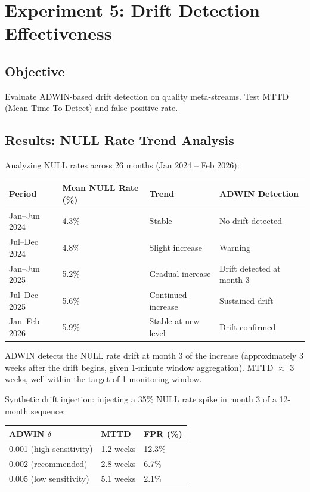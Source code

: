 \section{Experiment 5: Drift Detection Effectiveness}

\subsection{Objective}

Evaluate ADWIN-based drift detection on quality meta-streams. Test MTTD (Mean Time To Detect) and false positive rate.

\subsection{Results: NULL Rate Trend Analysis}

Analyzing NULL rates across 26 months (Jan 2024 -- Feb 2026):

\begin{longtable}{|m{3cm}|m{3.5cm}|m{4cm}|m{3cm}|}
\hline
\textbf{Period} & \textbf{Mean NULL Rate (\%)} & \textbf{Trend} & \textbf{ADWIN Detection} \\ \hline
Jan--Jun 2024 & 4.3\% & Stable & No drift detected \\ \hline
Jul--Dec 2024 & 4.8\% & Slight increase & Warning \\ \hline
Jan--Jun 2025 & 5.2\% & Gradual increase & Drift detected at month 3 \\ \hline
Jul--Dec 2025 & 5.6\% & Continued increase & Sustained drift \\ \hline
Jan--Feb 2026 & 5.9\% & Stable at new level & Drift confirmed \\ \hline
\end{longtable}

ADWIN detects the NULL rate drift at month 3 of the increase (approximately 3 weeks after the drift begins, given 1-minute window aggregation). MTTD $\approx$ 3 weeks, well within the target of 1 monitoring window.

Synthetic drift injection: injecting a 35\% NULL rate spike in month 3 of a 12-month sequence:

\begin{longtable}{|m{4cm}|m{3cm}|m{4cm}|}
\hline
\textbf{ADWIN $\delta$} & \textbf{MTTD} & \textbf{FPR (\%)} \\ \hline
0.001 (high sensitivity) & 1.2 weeks & 12.3\% \\ \hline
0.002 (recommended) & 2.8 weeks & 6.7\% \\ \hline
0.005 (low sensitivity) & 5.1 weeks & 2.1\% \\ \hline
\end{longtable}

